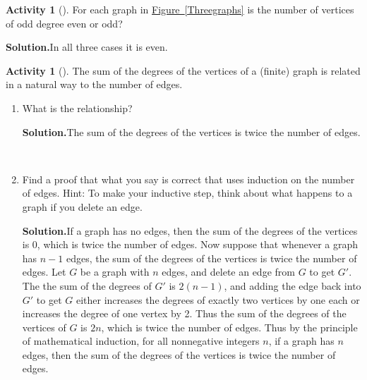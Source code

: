 \documentclass[10pt,]{book}
\theoremstyle{plain}
\theoremstyle{definition}
\newtheorem{activity}[project]{Activity}
\numberwithin{equation}{chapter}
\begin{document}
\begin{activity}[]\label{activity-46}
For each graph in \hyperref[Threegraphs]{Figure~\ref{Threegraphs}} is the number of vertices of odd degree even or odd?%
\par\medskip\noindent%
\textbf{Solution.}\quad In all three cases it is even.%
\end{activity}
\begin{activity}[]\label{activity-47}
The sum of the degrees of the vertices of a (finite) graph is related in a natural way to the number of edges.%
~\par
\begin{enumerate}[label=(\alph*)]
 \item What is the relationship?%
\par\medskip\noindent%
\textbf{Solution.}\quad The sum of the degrees of the vertices is twice the number of edges.%

~\par
\item Find a proof that what you say is correct that uses induction on the number of edges.  Hint:  To make your inductive step, think about what happens to a graph if you delete an edge.%
\par\medskip\noindent%
\textbf{Solution.}\quad If a graph has no edges, then the sum of the degrees of the vertices is 0, which is twice the number of edges. Now suppose that whenever a graph has \(n-1\) edges, the sum of the degrees of the vertices is twice the number of edges. Let \(G\) be a graph with \(n\) edges, and delete an edge from \(G\) to get \(G'\). The the sum of the degrees of \(G'\) is \(2(n-1)\), and adding the edge back into \(G'\) to get \(G\) either increases the degrees of exactly two vertices by one each or increases the degree of one vertex by 2. Thus the sum of the degrees of the vertices of \(G\) is \(2n\), which is twice the number of edges. Thus by the principle of mathematical induction, for all nonnegative integers \(n\), if a graph has \(n\) edges, then the sum of the degrees of the vertices is twice the number of edges.%


\end{enumerate}
\end{activity}
\end{document}
